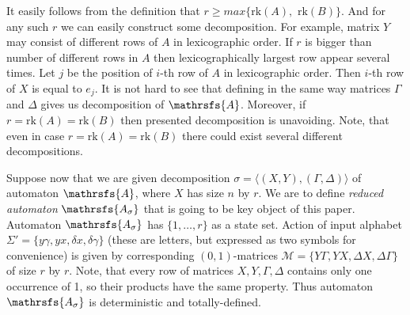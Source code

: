 \documentclass[11pt]{llncs}
\newcommand{\A}{\mathrsfs{A}}
\newcommand{\AD}{\mathrsfs{A_{\sigma}}}
\newcommand{\G}{\Gamma}
\newcommand{\D}{\Delta}
\newcommand{\g}{\gamma}
\newcommand{\dl}{\delta}
\newcommand{\rk}{\mathrm{rk}}
\begin{document}
It easily follows from the definition that $r \geq max\{\rk(A),$ $\rk(B)\}$.
And for any such $r$ we can easily construct some decomposition. 
For example, matrix $Y$ may consist of different rows of $A$ in lexicographic order.
If $r$ is bigger than number of different rows in $A$ then lexicographically largest row 
appear several times. Let $j$ be the position of $i$-th row of $A$ in lexicographic order.
Then $i$-th row of $X$ is equal to $e_j$. It is not hard to see that defining in the 
same way matrices $\G$ and $\D$ gives us decomposition of $\A$. Moreover,
if $r = \rk(A) = \rk(B)$ then presented decomposition is unavoiding. Note, that even in case
$r = \rk(A) = \rk(B)$ there could exist several different decompositions.

Suppose now that we are given decomposition $\sigma = \langle(X,Y), (\G,\D)\rangle$ of 
automaton $\A$, where $X$ has size $n$ by $r$.
We are to define \emph{reduced automaton} $\AD$ that is going to be key object of this paper.
Automaton $\AD$ has $\{1,\ldots, r\}$ as a state
set. Action of input alphabet $\Sigma' = \{ y\g, yx, \dl x, \dl\g \}$ (these are letters, 
but expressed as two symbols for convenience) is given
by corresponding $(0,1)$-matrices $\mathcal{M} =\{ Y\G , YX, \D X, \D\G \}$ of size $r$ by $r$.
Note, that every row of matrices $X, Y, \G, \D$ contains only one occurrence of 1, 
so their products have the same property. Thus automaton $\AD$
is deterministic and totally-defined.

\end{document}
